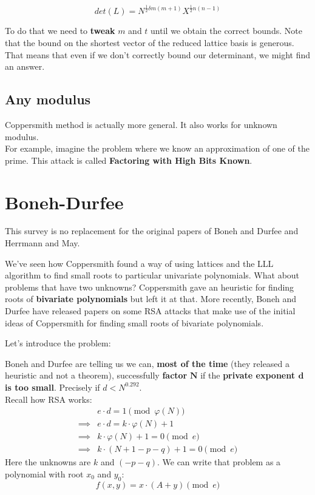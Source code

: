 \documentclass[a4paper,11pt]{article}
\begin{document}
\[ det(L) = N^{\frac{1}{2}\delta m (m+1)}X^{\frac{1}{2}n(n-1)} \]

To do that we need to \textbf{tweak} $m$ and $t$ until we obtain the correct bounds. Note that the bound on the shortest vector of the reduced lattice basis is generous. That means that even if we don't correctly bound our determinant, we might find an answer.

\subsection{Any modulus}\label{anymodulus}

Coppersmith method is actually more general. It also works for unknown modulus.\\
For example, imagine the problem where we know an approximation of one of the prime. This attack is called \textbf{Factoring with High Bits Known}.

\section{Boneh-Durfee}\label{bonehdurfee}

This survey is no replacement for the original papers of Boneh and Durfee\cite{bonehdurfee} and Herrmann and May\cite{herrmannmay}.

We've seen how Coppersmith found a way of using lattices and the LLL algorithm to find small roots to particular univariate polynomials. What about problems that have two unknowns? Coppersmith gave an heuristic for finding roots of \textbf{bivariate polynomials} but left it at that. More recently, Boneh and Durfee have released papers on some RSA attacks that make use of the initial ideas of Coppersmith for finding small roots of bivariate polynomials.

Let's introduce the problem:

Boneh and Durfee are telling us we can, \textbf{most of the time} (they released a heuristic and not a theorem), successfully \textbf{factor} $\textbf{N}$ if the \textbf{private exponent $\textbf{d}$ is too small}. Precisely if $d < N^{0.292}$.\\

Recall how RSA works:
\begin{align*}
&e \cdot d = 1 \pmod{\varphi(N)}\\
\implies& e \cdot d = k \cdot \varphi(N) + 1\\
\implies& k \cdot \varphi(N) + 1 = 0 \pmod{e}\\
\implies& k \cdot (N + 1 - p - q) + 1 = 0 \pmod{e}
\end{align*}
Here the unknowns are $k$ and $(-p-q)$. We can write that problem as a polynomial with root $x_0$ and $y_0$:
\[ f(x,y) = x \cdot (A + y) \pmod{e} \]
\end{document}
